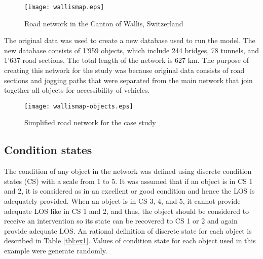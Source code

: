 \documentclass[a4paper,3p,times,authoryear]{elsarticle}
\begin{document}
\begin{figure}[H]
\begin{center}
\texttt{[image: wallismap.eps]}
\caption{Road network in the Canton of Wallis, Switzerland}\label{wallismap}
\end{center}
\end{figure}

The original data was used to create a new database used to run the model. The new database consists of 1'959 objects, which include 244 bridges, 78 tunnels, and 1'637 road sections. The total length of the network is 627 km. The purpose of creating this network for the study was because original data consists of road sections and jogging paths that were separated from the main network that join together all objects for accessibility of vehicles. 

\begin{figure}[H]
\begin{center}
\texttt{[image: wallismap-objects.eps]}
\caption{Simplified road network for the case study}\label{wallismapobjs}
\end{center}
\end{figure}

\subsection{Condition states}
The condition of any object in the network was defined using discrete condition states (CS) with a scale from 1 to 5.   It was assumed that if an object is in CS 1 and 2, it is considered as in an excellent or good condition and hence the LOS is adequately provided. When an object is in CS 3, 4, and 5, it cannot provide adequate LOS like in CS 1 and 2, and thus, the object should be considered to receive an intervention so its state can be recovered to CS 1 or 2 and again provide adequate LOS. An rational definition of discrete state for each object is described in Table \ref{tbl:ex1}. Values of condition state for each object used in this example were generate randomly.
\end{document}

